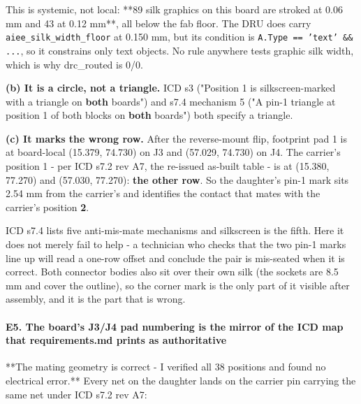 \documentclass[11pt,a4paper]{article}
\begin{document}
This is systemic, not local: {*}{*}89 silk graphics on this board are stroked at 0.06 mm and 43 at 0.12 mm{*}{*}, all below the fab floor. The DRU does carry \texttt{aiee\_silk\_width\_floor} at 0.150 mm, but its condition is \texttt{A.Type == 'text' \&\& ...}, so it constrains only text objects. No rule anywhere tests graphic silk width, which is why drc\_routed is 0/0.

\textbf{(b) It is a circle, not a triangle.} ICD s3 ("Position 1 is silkscreen-marked with a triangle on \textbf{both} boards") and s7.4 mechanism 5 ("A pin-1 triangle at position 1 of both blocks on \textbf{both} boards") both specify a triangle.

\textbf{(c) It marks the wrong row.} After the reverse-mount flip, footprint pad 1 is at board-local (15.379, 74.730) on J3 and (57.029, 74.730) on J4. The carrier's position 1 - per ICD s7.2 rev A7, the re-issued as-built table - is at (15.380, 77.270) and (57.030, 77.270): \textbf{the other row}. So the daughter's pin-1 mark sits 2.54 mm from the carrier's and identifies the contact that mates with the carrier's position \textbf{2}.

ICD s7.4 lists five anti-mis-mate mechanisms and silkscreen is the fifth. Here it does not merely fail to help - a technician who checks that the two pin-1 marks line up will read a one-row offset and conclude the pair is mis-seated when it is correct. Both connector bodies also sit over their own silk (the sockets are 8.5 mm and cover the outline), so the corner mark is the only part of it visible after assembly, and it is the part that is wrong.

\paragraph*{E5. The board's J3/J4 pad numbering is the mirror of the ICD map that requirements.md prints as authoritative}
{*}{*}The mating geometry is correct - I verified all 38 positions and found no electrical error.{*}{*} Every net on the daughter lands on the carrier pin carrying the same net under ICD s7.2 rev A7:
\end{document}

